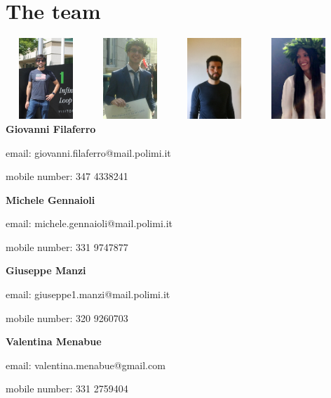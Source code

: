 \documentclass[a4paper,11pt]{report}
\begin{document}
\chapter{The team}
\begin{multicols}{2}

    \includegraphics[width=1.2in,height=1.2in,clip,keepaspectratio]{images/Filaferro.jpg}
    \vskip0.1in
    \includegraphics[width=1.2in,height=1.2in,clip,keepaspectratio]{images/Gennaioli.jpg}
    \vskip0.1in
    \includegraphics[width=1.2in,height=1.2in,clip,keepaspectratio]{images/Manzi.jpg}
    \vskip0.1in
    \includegraphics[width=1.2in,height=1.2in,clip,keepaspectratio]{images/Menabue.jpg}
    \columnbreak
    \vskip2in
    \textbf{Giovanni Filaferro}\par
    email: giovanni.filaferro@mail.polimi.it\par
    mobile number: 347 4338241\par
    \vskip0.7in
    \textbf{Michele Gennaioli}\par
    email: michele.gennaioli@mail.polimi.it\par
    mobile number: 331 9747877\par
    \vskip0.73in
    \textbf{Giuseppe Manzi}\par
    email: giuseppe1.manzi@mail.polimi.it\par
    mobile number: 320 9260703\par
    \vskip0.7in
    \textbf{Valentina Menabue}\par
    email: valentina.menabue@gmail.com\par
    mobile number: 331 2759404\par
\end{multicols}
\end{document}
